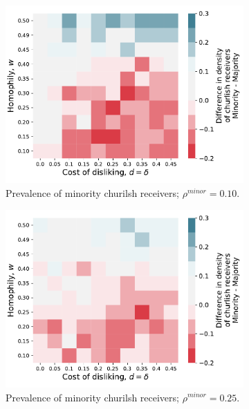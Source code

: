 \documentclass[11pt,letterpaper]{article}
\begin{document}
\begin{figure}[H]
\begin{subfigure}{0.4\textwidth}
    \centering
    \includegraphics[width=\textwidth]{Figures/churlish_receivers_diff_010.pdf}
    \caption{Prevalence of minority churilsh receivers; $\rho^{minor} = 0.10$.}
  \end{subfigure}
  \hfill
  \begin{subfigure}{0.4\textwidth}
    \centering
    \includegraphics[width=\textwidth]{Figures/churlish_receivers_diff_025.pdf}
    \caption{Prevalence of minority churilsh receivers; $\rho^{minor} = 0.25$.}
  \end{subfigure}
  \caption{}
\end{figure}
\end{document}
